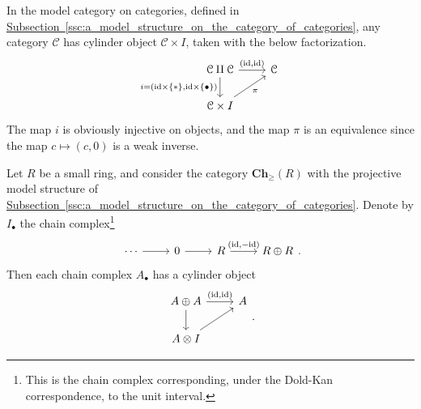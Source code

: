 \documentclass[main.tex]{subfiles}
\begin{document}
\begin{example}
  \label{eg:cylinder_objects_in_model_structure_on_cat}
  In the model category on categories, defined in \hyperref[ssc:a_model_structure_on_the_category_of_categories]{Subsection~\ref*{ssc:a_model_structure_on_the_category_of_categories}}, any category $\mathcal{C}$ has cylinder object $\mathcal{C} \times I$, taken with the below factorization.
  \begin{equation*}
    \begin{tikzcd}
      \mathcal{C} \amalg \mathcal{C}
      \arrow[d, swap, "i = {(\id \times \{*\}, \id \times \{\bullet\})}"]
      \arrow[r, "{(\id, \id)}"]
      & \mathcal{C}
      \\
      \mathcal{C} \times I
      \arrow[ur, swap, "\pi"]
    \end{tikzcd}
  \end{equation*}
  The map $i$ is obviously injective on objects, and the map $\pi$ is an equivalence since the map $c \mapsto (c, 0)$ is a weak inverse.
\end{example}

\begin{example}
  Let $R$ be a small ring, and consider the category $\mathbf{Ch}_{\geq}(R)$ with the projective model structure of \hyperref[ssc:a_model_structure_on_the_category_of_categories]{Subsection~\ref*{ssc:a_model_structure_on_the_category_of_categories}}. Denote by $I_{\bullet}$ the chain complex\footnote{This is the chain complex corresponding, under the Dold-Kan correspondence, to the unit interval.}
  \begin{equation*}
    \begin{tikzcd}
      \cdots
      \arrow[r]
      & 0
      \arrow[r]
      & R
      \arrow[r, "{( \id, -\id )}"]
      & R \oplus R
    \end{tikzcd}.
  \end{equation*}
  Then each chain complex $A_{\bullet}$ has a cylinder object
  \begin{equation*}
    \begin{tikzcd}
      A \oplus A
      \arrow[d]
      \arrow[r, "{(\id, \id)}"]
      & A
      \\
      A \otimes I
      \arrow[ur]
    \end{tikzcd}.
  \end{equation*}
\end{example}
\end{document}
